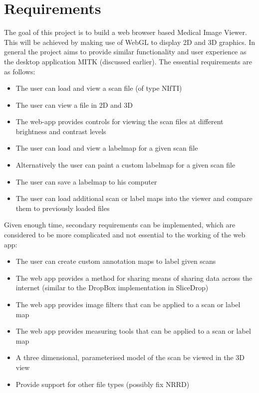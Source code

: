 \documentclass[a4paper,11pt,titlepage]{article}
\begin{document}
\section{Requirements}

The goal of this project is to build a web browser based Medical Image Viewer. This will be achieved by making use of WebGL to display 2D and 3D graphics. In general the project aims to provide similar functionality and user experience as the desktop application MITK (discussed earlier). The essential requirements are as follows:

\begin{itemize}
\item The user can load and view a scan file (of type NIfTI)
\item The user can view a file in 2D and 3D
\item The web-app provides controls for viewing the scan files at different brightness and contrast levels
\item The user can load and view a labelmap for a given scan file
\item Alternatively the user can paint a custom labelmap for a given scan file
\item The user can save a labelmap to his computer
\item The user can load additional scan or label maps into the viewer and compare them to previously loaded files
\end{itemize}

Given enough time, secondary requirements can be implemented, which are considered to be more complicated and not essential to the working of the web app:

\begin{itemize}
\item The user can create custom annotation maps to label given scans
\item The web app provides a method for sharing  means of sharing data across the internet (similar to the DropBox implementation in SliceDrop)
\item The web app provides image filters that can be applied to a scan or label map
\item The web app provides measuring tools that can be applied to a scan or label map
\item A three dimensional, parameterised model of the scan be viewed in the 3D view
\item Provide support for other file types (possibly fix NRRD)
\end{itemize}
\end{document}
